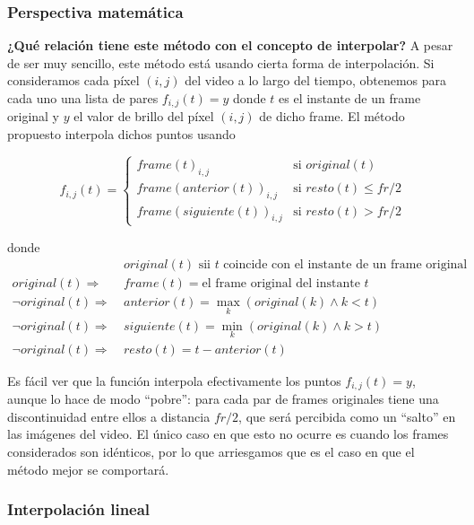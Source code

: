 \subsubsection*{\bf{Perspectiva matem\'atica}}

\textbf{¿Qu\'e relaci\'on tiene este m\'etodo con el concepto de interpolar?} A pesar de ser muy sencillo, este método está usando cierta forma de interpolación. Si consideramos cada píxel $(i, j)$ del video a lo largo del tiempo, obtenemos para cada uno una lista de pares $f_{i,j}(t)=y$ donde $t$ es el instante de un frame original y $y$ el valor de brillo del píxel $(i,j)$ de dicho frame. El método propuesto interpola dichos puntos usando 

\[
f_{i,j}(t) = 
\left\{
    \begin{array}{ll}
        frame(t)_{i,j} & \mbox{si } original(t) \\
        frame(anterior(t))_{i,j} & \mbox{si } resto(t) \leq fr/2 \\     
        frame(siguiente(t))_{i,j} & \mbox{si } resto(t) > fr/2
    \end{array}
\right.
\]

donde 
\begin{align*}
    &original(t) \text{ sii } t \text{ coincide con el instante de un frame original}\\
    original(t) \Rightarrow\ &frame(t)=\text{el frame original del instante } t\\
    \neg original(t) \Rightarrow\ &anterior(t) = \max_{k}(original(k) \wedge k < t)\\
    \neg original(t) \Rightarrow\ &siguiente(t) = \min_{k}(original(k) \wedge k > t)\\
    \neg original(t) \Rightarrow\ &resto(t) = t-anterior(t)
\end{align*}

Es fácil ver que la función interpola efectivamente los puntos $f_{i,j}(t)=y$, aunque lo hace de modo ``pobre'': para cada par de frames originales tiene una discontinuidad entre ellos a distancia $fr/2$, que será percibida como un ``salto'' en las imágenes del video. El único caso en que esto no ocurre es cuando los frames considerados son idénticos, por lo que arriesgamos que es el caso en que el método mejor se comportará.

\subsubsection{Interpolaci\'on lineal}


